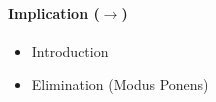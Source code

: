 \paragraph{Implication ($\to$)}
\begin{itemize}
  \item Introduction
        \begin{prooftree}
        \end{prooftree}
  \item Elimination (Modus Ponens)
        \begin{prooftree}
        \end{prooftree}
\end{itemize}








